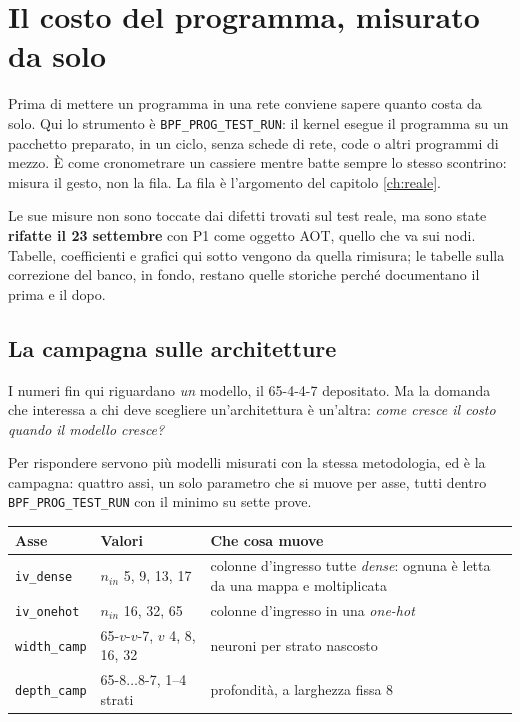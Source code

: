 \documentclass[11pt,a4paper,oneside]{report}
\begin{document}
\chapter{Il costo del programma, misurato da solo}
\label{ch:programma}

Prima di mettere un programma in una rete conviene sapere quanto costa da solo.
Qui lo strumento è \texttt{BPF\_PROG\_TEST\_RUN}: il kernel esegue il programma
su un pacchetto preparato, in un ciclo, senza schede di rete, code o altri
programmi di mezzo. È come cronometrare un cassiere mentre batte sempre lo
stesso scontrino: misura il gesto, non la fila. La fila è l'argomento del
capitolo \ref{ch:reale}.

Le sue misure non sono toccate dai difetti trovati sul test reale, ma sono
state \textbf{rifatte il 23 settembre} con P1 come oggetto AOT, quello che va sui
nodi. Tabelle, coefficienti e grafici qui sotto vengono da quella rimisura; le
tabelle sulla correzione del banco, in fondo, restano quelle storiche perché
documentano il prima e il dopo.

\section{La campagna sulle architetture}

I numeri fin qui riguardano \emph{un} modello, il 65-4-4-7 depositato. Ma la
domanda che interessa a chi deve scegliere un'architettura è un'altra:
\emph{come cresce il costo quando il modello cresce?}

Per rispondere servono più modelli misurati con la stessa metodologia, ed è la
campagna: quattro assi, un solo parametro che si muove per asse, tutti dentro
\texttt{BPF\_PROG\_TEST\_RUN} con il minimo su sette prove.

\begin{center}
\small
\begin{tabular}{@{}llp{7.1cm}@{}}
\toprule
\textbf{Asse} & \textbf{Valori} & \textbf{Che cosa muove} \\
\midrule
\texttt{iv\_dense}   & $n_{in}$ 5, 9, 13, 17 &
  colonne d'ingresso tutte \emph{dense}: ognuna è letta da una mappa e
  moltiplicata \\
\texttt{iv\_onehot}  & $n_{in}$ 16, 32, 65 &
  colonne d'ingresso in una \emph{one-hot} \\
\texttt{width\_camp} & 65-$v$-$v$-7, $v$ 4, 8, 16, 32 &
  neuroni per strato nascosto \\
\texttt{depth\_camp} & 65-8$\ldots$8-7, 1--4 strati &
  profondità, a larghezza fissa 8 \\
\bottomrule
\end{tabular}
\end{center}
\end{document}
